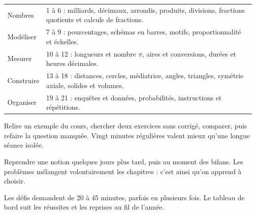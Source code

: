 \clearpage\thispagestyle{otFront}\label{parcours}\fontsize{11}{15}\selectfont

\begin{tabularx}{\linewidth}{@{}lY@{}}\toprule
Nombres & 1 à 6 : milliards, décimaux, arrondis, produits, divisions, fractions quotients et calculs de fractions.\\[3mm]
Modéliser & 7 à 9 : pourcentages, schémas en barres, motifs, proportionnalité et échelles.\\[3mm]
Mesurer & 10 à 12 : longueurs et nombre $\pi$, aires et conversions, durées et heures décimales.\\[3mm]
Construire & 13 à 18 : distances, cercles, médiatrice, angles, triangles, symétrie axiale, solides et volumes.\\[3mm]
Organiser & 19 à 21 : enquêtes et données, probabilités, instructions et répétitions.\\\bottomrule
\end{tabularx}
\begin{savoirfaire}Relire un exemple du cours,
chercher deux exercices sans corrigé, comparer, puis refaire la question
manquée. Vingt minutes régulières valent mieux qu’une longue séance
isolée.\end{savoirfaire}
\begin{savoirfaire}Reprendre une notion quelques jours
plus tard, puis au moment des bilans. Les problèmes mélangent
volontairement les chapitres : c’est ainsi qu’on apprend à choisir.\end{savoirfaire}
Les défis demandent de 20 à 45 minutes, parfois en plusieurs fois.
Le tableau de bord suit les réussites et les reprises au fil de l’année.

\clearpage
